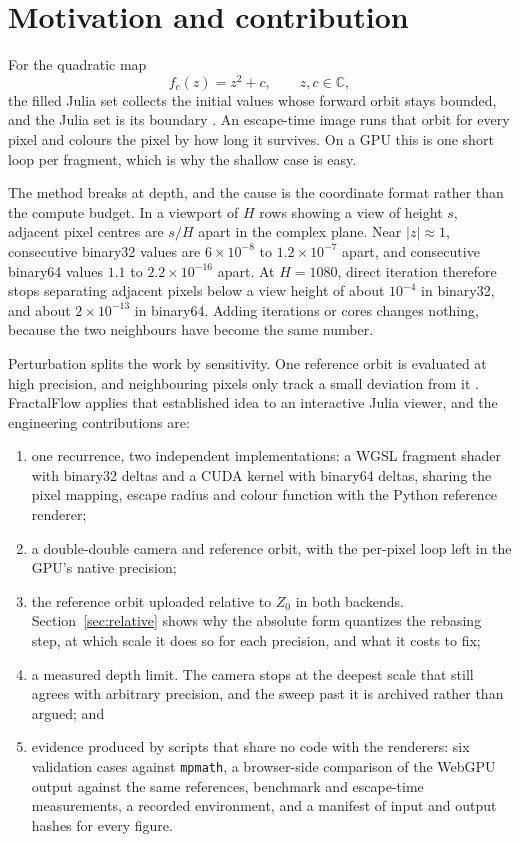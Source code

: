 \documentclass[10pt,a4paper]{article}
\begin{document}
\section{Motivation and contribution}

For the quadratic map
\begin{equation}
  f_c(z) = z^2 + c,\qquad z,c\in\mathbb{C},
  \label{eq:quadratic}
\end{equation}
the filled Julia set collects the initial values whose forward orbit stays
bounded, and the Julia set is its boundary \cite{milnor2006}. An escape-time
image runs that orbit for every pixel and colours the pixel by how long it
survives. On a GPU this is one short loop per fragment, which is why the
shallow case is easy.

The method breaks at depth, and the cause is the coordinate format rather than
the compute budget. In a viewport of \(H\) rows showing a view of height
\(s\), adjacent pixel
centres are \(s/H\) apart in the complex plane. Near \(|z|\approx 1\),
consecutive binary32 values are \(6\times10^{-8}\) to \(1.2\times10^{-7}\)
apart, and consecutive binary64 values \(1.1\) to \(2.2\times10^{-16}\) apart.
At \(H=1080\), direct iteration therefore stops separating adjacent pixels
below a view height of about \(10^{-4}\) in binary32, and about
\(2\times10^{-13}\) in binary64.
Adding iterations or cores changes nothing, because the two neighbours have
become the same number.

Perturbation splits the work by sensitivity. One reference orbit is evaluated
at high precision, and neighbouring pixels only track a small deviation from it
\cite{martin2013,heilandallen2013}. FractalFlow applies that established idea
to an interactive Julia viewer, and the engineering contributions are:

\begin{enumerate}
  \item one recurrence, two independent implementations: a WGSL fragment
        shader with binary32 deltas and a CUDA kernel with binary64 deltas,
        sharing the pixel mapping, escape radius and colour function with the
        Python reference renderer;
  \item a double-double camera and reference orbit, with the per-pixel loop
        left in the GPU's native precision;
  \item the reference orbit uploaded relative to \(Z_0\) in both backends.
        Section~\ref{sec:relative} shows why the absolute form quantizes the
        rebasing step, at which scale it does so for each precision, and what
        it costs to fix;
  \item a measured depth limit. The camera stops at the deepest scale that
        still agrees with arbitrary precision, and the sweep past it is
        archived rather than argued; and
  \item evidence produced by scripts that share no code with the renderers:
        six validation cases against \texttt{mpmath}, a browser-side comparison
        of the WebGPU output against the same references, benchmark and
        escape-time measurements, a recorded environment, and a manifest of
        input and output hashes for every figure.
\end{enumerate}
\end{document}
